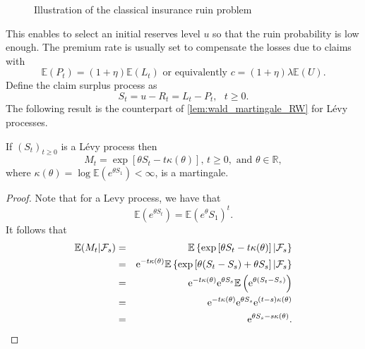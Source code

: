 \begin{figure} 
\begin{center}
\end{center}
\label{fig:ruin_time_CL}
\caption{Illustration of the classical insurance ruin problem}
\end{figure}
This enables to select an initial reserves level $u$ so that the ruin probability is low enough. The premium rate is usually set to compensate the losses due to claims with 
$$
\mathbb{E}(P_t) = (1+\eta)\mathbb{E}(L_t)\text{ or  equivalently } c = (1+\eta)\lambda\mathbb{E}(U).
$$
Define the claim surplus process as
$$
S_t = u - R_t = L_t-P_t,\text{ }t\geq 0.
$$
The following result is the counterpart of \cref{lem:wald_martingale_RW} for Lévy processes.
\begin{prop}\label{prop:wald_martingale_levy}
If $(S_t)_{t\geq0}$ is a L\'evy process then
$$
M_t = \exp\left[\theta S_t-t\kappa(\theta)\right]\text{, }t\geq0,\text{ and }\theta\in \mathbb{R}, 
$$
where $\kappa(\theta)=\log\mathbb{E}\left(e^{\theta S_1}\right)<\infty$, is a martingale.
\begin{proof}
Note that for a Levy process, we have that 
\[
\mathbb{E}(e^{\theta S_t}) =\mathbb{E}(e^\theta S_1)^t. 
\]
It follows that 
\begin{eqnarray*}
\mathbb{E}(M_t|\mathcal{F}_s) &=&\mathbb{E}\left\{\exp\left[\theta S_t-t\kappa(\theta)\right]|\mathcal{F}_s\right\} \\
&=&\mathrm{e}^{-t\kappa(\theta)}\mathbb{E}\left\{\exp\left[\theta (S_t-S_s) + \theta S_s\right]|\mathcal{F}_s\right\}\\
&=&\mathrm{e}^{-t\kappa(\theta)}\mathrm{e}^{\theta S_s}\mathbb{E}\left(\mathrm{e}^{\theta (S_t-S_s)}\right)\\
&=&\mathrm{e}^{-t\kappa(\theta)}\mathrm{e}^{\theta S_s}\mathrm{e}^{(t-s)\kappa(\theta)}\\
&=&\mathrm{e}^{\theta S_s -s\kappa(\theta)}.
\end{eqnarray*}
\end{proof}
\end{prop}
